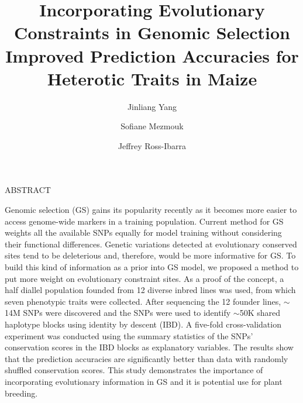 \documentclass[12pt]{article}
\title{Incorporating Evolutionary Constraints in Genomic Selection Improved Prediction Accuracies for Heterotic Traits in Maize}
\date{}
\author[1]{Jinliang Yang}
\author[1,2]{Sofiane Mezmouk}
\author[1]{Jeffrey Ross-Ibarra}
\affil[1]{Department of Plant Sciences, University of California, Davis, CA 95616}
\affil[2]{Current address: Institute of sciences, Somewhere, Street of Something}
\newcommand{\smalllineskip}{\baselineskip=15pt}
\renewenvironment{abstract}[0]{\small\rm
        \begin{center}ABSTRACT
        \\ \vspace{8pt}
        \begin{minipage}{5.2in}\smalllineskip
        \hspace{1pc}}{\end{minipage}\end{center}\vspace{-1pt}}
\begin{document}
\maketitle

\begin{abstract}

Genomic selection (GS) gains its popularity recently as it becomes more easier to access genome-wide markers in a training population. Current method for GS weights all the available SNPs equally for model training without considering their functional differences. Genetic variations detected at evolutionary conserved sites tend to be deleterious and, therefore, would be more informative for GS. To build this kind of information as a prior into GS model, we proposed a method to put more weight on evolutionary constraint sites. As a proof of the concept, a half diallel population founded from 12 diverse inbred lines was used, from which seven phenotypic traits were collected. After sequencing the 12 founder lines, $\sim$14M SNPs were discovered and the SNPs were used to identify $\sim$50K shared haplotype blocks using identity by descent (IBD). A five-fold cross-validation experiment was conducted using the summary statistics of the SNPs' conservation scores in the IBD blocks as explanatory variables. The results show that the prediction accuracies are significantly better than data with randomly shuffled conservation scores. This study demonstrates the importance of incorporating evolutionary information in GS and it is potential use for plant breeding.

\end{abstract}
\end{document}
